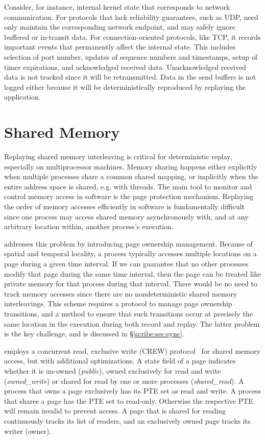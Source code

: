Consider, for instance, internal kernel state that corresponds to
network communication. For protocols that lack reliability guarantees,
such as UDP, \scribe{} need only maintain the corresponding network
endpoint, and may safely ignore buffered or
in-transit data. For connection-oriented protocols, like TCP, it
records important events that permanently affect the internal
state. This includes selection of port number, updates of sequence
numbers and timestamps, setup of timer expirations, and acknowledged
received data. Unacknowledged received data is not tracked since it
will be retransmitted. Data in the send buffers is not logged either
because it will be deterministically reproduced by replaying the
application.

  
\section{Shared Memory}
\label{scribe:sec:memory}

Replaying shared memory interleaving is critical for deterministic
replay, especially on multiprocessor machines.  Memory sharing happens
either explicitly when multiple processes share a common shared
mapping, or implicitly when the entire address space is shared,
e.g. with threads.  The main tool to monitor and control memory
access in software is the page protection mechanism.  Replaying the
order of memory accesses efficiently in software is fundamentally
difficult since one process may access shared memory asynchronously
with, and at any arbitrary location within, another process's
execution.

   

\scribe{} addresses this problem by introducing page ownership
management. Because of spatial and temporal locality, a process
typically accesses multiple locations on a page during a given time
interval.  If we can guarantee that no other processes modify that
page during the same time interval, then the page can be treated like
private memory for that process during that interval.  There would be
no need to track memory accesses since there are no nondeterministic
shared memory interleavings. This scheme requires a
protocol to manage page ownership transitions, and a method to ensure
that such transitions occur at precisely the same location in the
execution during both record and replay. The latter problem is the
key challenge, and is discussed in \S\ref{scribe:sec:sync}.

\scribe{} employs a concurrent read, exclusive write (CREW)
protocol~\cite{crew,instant-replay} for shared memory access, but with
additional optimizations.  A state
field of a page indicates whether it is un-owned ({\em public}), owned
exclusively for read and write ({\em owned\_write}) or shared for read
by one or more processes ({\em shared\_read}). A process that owns
a page exclusively has its PTE set as read and write. A process that
shares a page has the PTE set to read-only. Otherwise the respective
PTE will remain invalid to prevent access. A page that is shared for
reading continuously tracks its list of readers, and an exclusively
owned page tracks its writer (owner).


